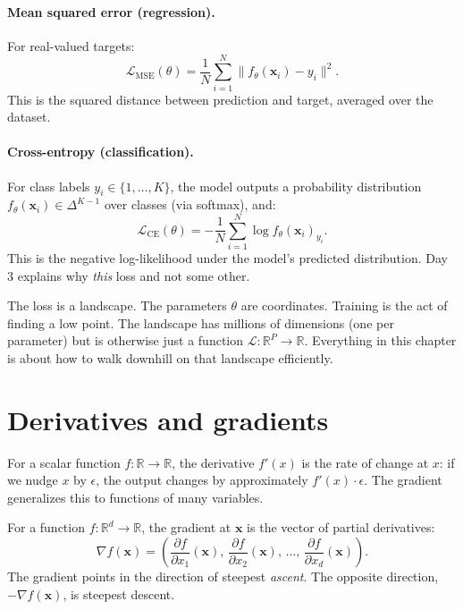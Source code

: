 \paragraph{Mean squared error (regression).} For real-valued targets:
\[
\mathcal{L}_{\text{MSE}}(\theta) = \frac{1}{N} \sum_{i=1}^N \|f_\theta(\bm{x}_i) - y_i\|^2.
\]
This is the squared distance between prediction and target, averaged over the dataset.

\paragraph{Cross-entropy (classification).} For class labels $y_i \in \{1, \ldots, K\}$, the model outputs a probability distribution $f_\theta(\bm{x}_i) \in \Delta^{K-1}$ over classes (via softmax), and:
\[
\mathcal{L}_{\text{CE}}(\theta) = -\frac{1}{N} \sum_{i=1}^N \log f_\theta(\bm{x}_i)_{y_i}.
\]
This is the negative log-likelihood under the model's predicted distribution. Day 3 explains why \emph{this} loss and not some other.

\begin{intuition}
The loss is a landscape. The parameters $\theta$ are coordinates. Training is the act of finding a low point. The landscape has millions of dimensions (one per parameter) but is otherwise just a function $\mathcal{L}: \mathbb{R}^P \to \mathbb{R}$. Everything in this chapter is about how to walk downhill on that landscape efficiently.
\end{intuition}

\section{Derivatives and gradients}

For a scalar function $f: \mathbb{R} \to \mathbb{R}$, the derivative $f'(x)$ is the rate of change at $x$: if we nudge $x$ by $\epsilon$, the output changes by approximately $f'(x) \cdot \epsilon$. The gradient generalizes this to functions of many variables.

\begin{definition}[Gradient]
For a function $f: \mathbb{R}^d \to \mathbb{R}$, the gradient at $\bm{x}$ is the vector of partial derivatives:
\[
\nabla f(\bm{x}) = \left( \frac{\partial f}{\partial x_1}(\bm{x}), \, \frac{\partial f}{\partial x_2}(\bm{x}), \, \ldots, \, \frac{\partial f}{\partial x_d}(\bm{x}) \right).
\]
The gradient points in the direction of steepest \emph{ascent}. The opposite direction, $-\nabla f(\bm{x})$, is steepest descent.
\end{definition}

